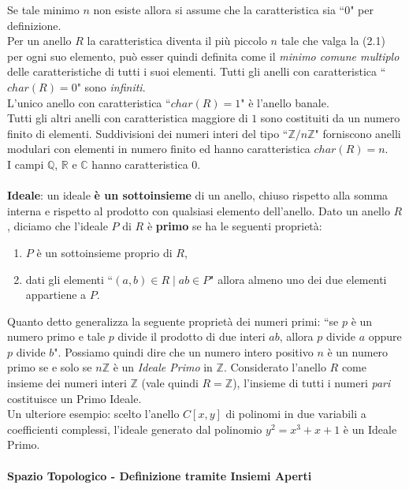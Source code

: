 \documentclass[a4paper,12pt]{tesiinfo}
\begin{document}
Se tale minimo $n$ non esiste allora si assume che la caratteristica sia ``0" per definizione.
\\
Per un anello $R$ la caratteristica diventa il pi\`u piccolo $n$ tale che valga la (2.1) per ogni suo elemento, pu\`o esser quindi definita come il \textit{minimo comune multiplo} delle caratteristiche di tutti i suoi elementi. 
Tutti gli anelli con caratteristica ``$char(R)=0$" sono \textit{infiniti}.
\\
L'unico anello con caratteristica ``$char(R)=1$" \`e l'anello banale.
\\
Tutti gli altri anelli con caratteristica maggiore di $1$ sono costituiti da un numero finito di elementi. Suddivisioni dei numeri interi del tipo ``$\mathbb{Z}/n\mathbb{Z}$" forniscono anelli modulari con elementi in numero finito ed hanno caratteristica $char(R) = n$.\\
I campi $\mathbb{Q}$, $\mathbb{R}$ e $\mathbb{C}$ hanno caratteristica $0$.
\\\\
%
%
%
\textbf{Ideale}: un ideale \textbf{\`e un sottoinsieme} di un anello, chiuso rispetto alla somma interna e rispetto al prodotto con qualsiasi elemento dell'anello.
Dato un anello $R$, diciamo che l'ideale $P$ di $R$ \`e \textbf{primo} se ha le seguenti propriet\`a:
\begin{enumerate}
 \item $P$ \`e un sottoinsieme proprio di $R$,
 \item dati gli elementi ``$(a, b) \in R \mid ab \in P$" allora almeno uno dei due elementi appartiene a $P$.
\end{enumerate}
Quanto detto generalizza la seguente propriet\`a dei numeri primi: ``se $p$ \`e un numero primo e tale $p$ divide il prodotto di due interi $ab$, allora $p$ divide $a$ oppure $p$ divide $b$". Possiamo quindi dire che un numero intero positivo $n$ \`e un numero primo se e solo se $n\mathbb{Z}$ \`e un \textit{Ideale Primo} in $\mathbb{Z}$. Considerato l'anello $R$ come insieme dei numeri interi $\mathbb{Z}$ (vale quindi $R = \mathbb{Z}$), l'insieme di tutti i numeri \textit{pari} costituisce un Primo Ideale.
\\
Un ulteriore esempio: scelto l'anello $C[x, y]$ di polinomi in due variabili a coefficienti complessi, l'ideale generato dal polinomio $y^2 = x^3 +x +1$ \`e un Ideale Primo.
\\\\
%
%
%
\textbf{Spazio Topologico - Definizione tramite Insiemi Aperti}
\\\\
\end{document}
